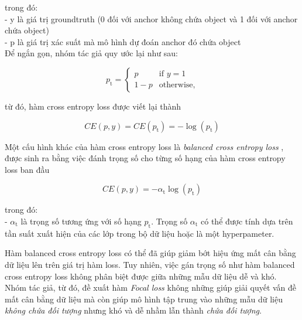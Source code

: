 {    \noindent
    trong đó: \\
    - y là giá trị groundtruth  (0 đối với anchor  không chứa object và 1 đối với anchor  chứa object) \\
    - p là giá trị xác suất mà mô hình dự đoán anchor  đó chứa object \\
    Để ngắn gọn, nhóm tác giả quy ước lại như sau:

    \begin{equation}
        \label{eq:bce}
        p_\textrm{t} =
        \begin{cases}
            p &\text{if $y = 1$} \\
            1 - p &\text{otherwise,}
        \end{cases}
    \end{equation}

    \noindent
    từ đó, hàm cross entropy loss  được viết lại thành

    \begin{equation}
        CE(p,y) = CE(p_\textrm{t}) = - \log (p_\textrm{t})
    \end{equation}

    \noindent
    Một cấu hình khác của hàm cross entropy loss  là \textit{balanced cross entropy loss} , được sinh ra bằng việc đánh trọng số cho từng số hạng của hàm cross entropy loss  ban đầu

    \begin{equation}
        CE(p,y) = - \alpha_\textrm{t} \log (p_\textrm{t})
    \end{equation}

    \noindent
    trong đó: \\
    - $\alpha_\textrm{t}$ là trọng số tương ứng với số hạng $p_\textrm{t}$.
    Trọng số $\alpha_\textrm{t}$ có thể được tính dựa trên tần suất xuất hiện của các lớp trong bộ dữ liệu hoặc là một hyperpameter.

    \noindent
    Hàm balanced cross entropy loss  có thể đã giúp giảm bớt hiệu ứng mất cân bằng dữ liệu  lên trên giá trị hàm loss.
    Tuy nhiên, việc gán trọng số như hàm balanced cross entropy loss  không phân biệt được giữa những mẫu dữ liệu dễ và khó.
    Nhóm tác giả, từ đó, đề xuất hàm \textit{Focal loss} không những giúp giải quyết vấn đề mất cân bằng dữ liệu  mà còn giúp mô hình tập trung vào những mẫu dữ liệu \textit{không chứa đối tượng} nhưng khó và dễ nhầm lẫn thành \textit{chứa đối tượng}.

}
